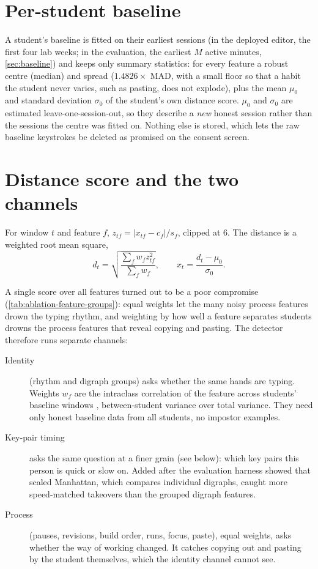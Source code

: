 \section{Per-student baseline}
A student's baseline is fitted on their earliest sessions (in the deployed
editor, the first four lab weeks; in the evaluation, the earliest $M$ active
minutes, \cref{sec:baseline}) and keeps only summary statistics: for every feature a robust
centre (median) and spread ($1.4826\times$ MAD, with a small floor so that a
habit the student never varies, such as pasting, does not explode), plus the
mean $\mu_0$ and standard deviation $\sigma_0$ of the student's own distance
score. $\mu_0$ and $\sigma_0$ are estimated leave-one-session-out, so they
describe a \emph{new} honest session rather than the sessions the centre was
fitted on. Nothing else is stored, which lets the raw baseline keystrokes be
deleted as promised on the consent screen.

\section{Distance score and the two channels}
For window $t$ and feature $f$, $z_{tf}=|x_{tf}-c_f|/s_f$, clipped at 6.
The distance is a weighted root mean square,
\begin{equation}
  d_t=\sqrt{\frac{\sum_f w_f z_{tf}^2}{\sum_f w_f}},\qquad
  x_t=\frac{d_t-\mu_0}{\sigma_0}.
\end{equation}

A single score over all features turned out to be a poor compromise
(\cref{tab:ablation-feature-groups}): equal weights let the many noisy
process features drown the typing rhythm, and weighting by how well a
feature separates students drowns the process features that reveal copying
and pasting. The detector therefore runs separate channels:
\begin{description}
  \item[Identity] (rhythm and digraph groups) asks whether the same hands
  are typing. Weights $w_f$ are the intraclass correlation of the feature
  across students' baseline windows \cite{shrout1979icc}, between-student
  variance over total variance. They need only honest baseline data from all
  students, no impostor examples.
  \item[Key-pair timing] asks the same question at a finer grain (see
  below): which key pairs this person is quick or slow on. Added after the
  evaluation harness showed that scaled Manhattan, which compares individual
  digraphs, caught more speed-matched takeovers than the grouped digraph
  features.
  \item[Process] (pauses, revisions, build order, runs, focus, paste), equal
  weights, asks whether the way of working changed. It catches copying out
  and pasting by the student themselves, which the identity channel cannot
  see.
\end{description}

